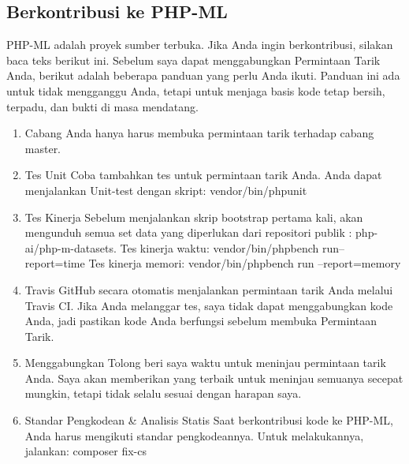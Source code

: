 \subsection{Berkontribusi ke PHP-ML}
\par PHP-ML adalah proyek sumber terbuka. Jika Anda ingin berkontribusi, silakan baca teks berikut ini. Sebelum saya dapat menggabungkan Permintaan Tarik Anda, berikut adalah beberapa panduan yang perlu Anda ikuti. Panduan ini ada untuk tidak mengganggu Anda, tetapi untuk menjaga basis kode tetap bersih, terpadu, dan bukti di masa mendatang.
\begin{enumerate}
\item Cabang
Anda hanya harus membuka permintaan tarik terhadap cabang master.
\item Tes Unit
Coba tambahkan tes untuk permintaan tarik Anda. Anda dapat menjalankan Unit-test dengan skript:
	vendor/bin/phpunit
\item Tes Kinerja
Sebelum menjalankan skrip bootstrap pertama kali, akan mengunduh semua set data yang diperlukan dari repositori publik : php-ai/php-m-datasets.
Tes kinerja waktu:
vendor/bin/phpbench run--report=time
Tes kinerja memori:
vendor/bin/phpbench run --report=memory
\item Travis
GitHub secara otomatis menjalankan permintaan tarik Anda melalui Travis CI. Jika Anda melanggar tes, saya tidak dapat menggabungkan kode Anda, jadi pastikan kode Anda berfungsi sebelum membuka Permintaan Tarik.
\item Menggabungkan
Tolong beri saya waktu untuk meninjau permintaan tarik Anda. Saya akan memberikan yang terbaik untuk meninjau semuanya secepat mungkin, tetapi tidak selalu sesuai dengan harapan saya.
\item Standar Pengkodean \& Analisis Statis
Saat berkontribusi kode ke PHP-ML, Anda harus mengikuti standar pengkodeannya. Untuk melakukannya, jalankan:
	composer fix-cs
\end{enumerate}








